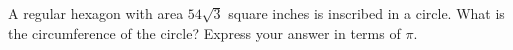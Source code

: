 A regular hexagon with area $54\sqrt3$ square inches is inscribed in a circle. What is the circumference of the circle? Express your answer in terms of $\pi$.
